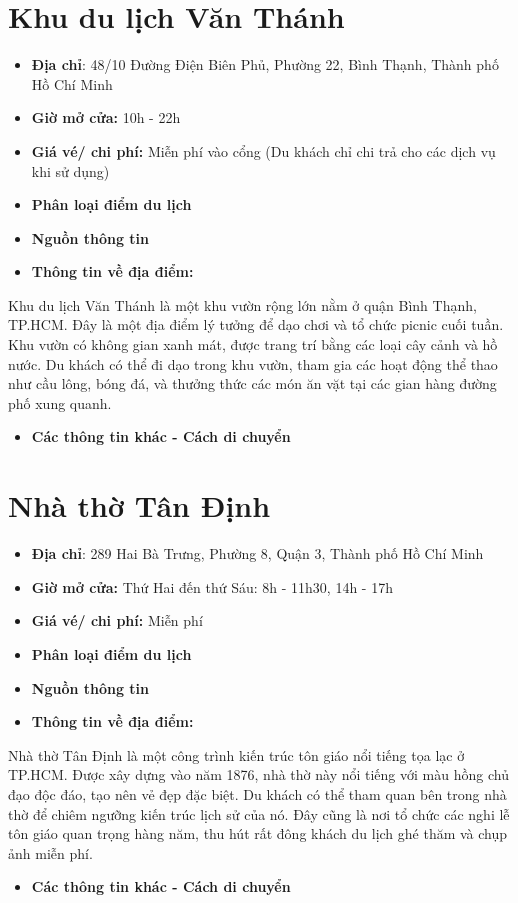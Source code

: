 \documentclass{article}
\begin{document}
\section{Khu du lịch Văn Thánh}
\begin{itemize}
    \item{\textbf{Địa chỉ}: 48/10 Đường Điện Biên Phủ, Phường 22, Bình Thạnh, Thành phố Hồ Chí Minh}
    \item{\textbf{Giờ mở cửa:} 10h - 22h}
    \item{\textbf{Giá vé/ chi phí:} Miễn phí vào cổng (Du khách chỉ chi trả cho các dịch vụ khi sử dụng)}
    \item{\textbf{Phân loại điểm du lịch} }
    \item{\textbf{Nguồn thông tin}}
    \item{\textbf{Thông tin về địa điểm:}}
\end{itemize}
Khu du lịch Văn Thánh là một khu vườn rộng lớn nằm ở quận Bình Thạnh, TP.HCM. Đây là một địa điểm lý tưởng để dạo chơi và tổ chức picnic cuối tuần. Khu vườn có không gian xanh mát, được trang trí bằng các loại cây cảnh và hồ nước. Du khách có thể đi dạo trong khu vườn, tham gia các hoạt động thể thao như cầu lông, bóng đá, và thưởng thức các món ăn vặt tại các gian hàng đường phố xung quanh.
\begin{itemize}
    \item{\textbf{Các thông tin khác - Cách di chuyển}}
\end{itemize}

\section{Nhà thờ Tân Định}
\begin{itemize}
    \item{\textbf{Địa chỉ}: 289 Hai Bà Trưng, Phường 8, Quận 3, Thành phố Hồ Chí Minh}
    \item{\textbf{Giờ mở cửa:} Thứ Hai đến thứ Sáu: 8h - 11h30, 14h - 17h}
    \item{\textbf{Giá vé/ chi phí:} Miễn phí}
    \item{\textbf{Phân loại điểm du lịch} }
    \item{\textbf{Nguồn thông tin}}
    \item{\textbf{Thông tin về địa điểm:}}
\end{itemize}
Nhà thờ Tân Định là một công trình kiến trúc tôn giáo nổi tiếng tọa lạc ở TP.HCM. Được xây dựng vào năm 1876, nhà thờ này nổi tiếng với màu hồng chủ đạo độc đáo, tạo nên vẻ đẹp đặc biệt. Du khách có thể tham quan bên trong nhà thờ để chiêm ngưỡng kiến trúc lịch sử của nó. Đây cũng là nơi tổ chức các nghi lễ tôn giáo quan trọng hàng năm, thu hút rất đông khách du lịch ghé thăm và chụp ảnh miễn phí.
\begin{itemize}
    \item{\textbf{Các thông tin khác - Cách di chuyển}}
\end{itemize}
\end{document}
